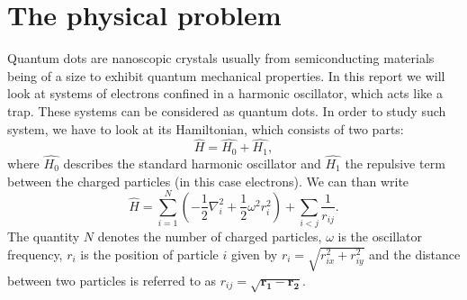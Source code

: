 \section{The physical problem}\label{sec:problem}
Quantum dots are nanoscopic crystals usually from semiconducting materials being of a size to exhibit quantum mechanical properties. In this report we will look at systems of electrons confined in a harmonic oscillator, which acts like a trap. These systems can be considered as quantum dots. In order to study such system, we have to look at its Hamiltonian, which consists of two parts:
\begin{equation}
\hat{H} = \hat{H_0} + \hat{H_1},
\end{equation}
where $\hat{H_0}$ describes the standard harmonic oscillator and $\hat{H_1}$ the repulsive term between the charged particles (in this case electrons). We can than write
\begin{equation}
\hat{H} = \sum_{i=1}^N \left( -\frac{1}{2} \nabla_i^2 + \frac{1}{2} \omega^2 r_i^2 \right) + \sum_{i<j} \frac{1}{r_{ij}}.
\end{equation}
The quantity $N$ denotes the number of charged particles, $\omega$ is the oscillator frequency, $r_i$ is the position of particle $i$ given by $r_i = \sqrt{r_{ix}^2 + r_{iy}^2}$ and the distance between two particles is referred to as $r_{ij} = \sqrt{\mathbf{r_1}- \mathbf{r_2}}$.\\
